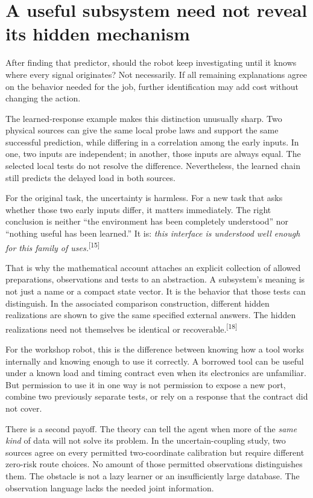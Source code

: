\documentclass[11pt]{article}
\newcommand{\sn}[1]{\textsuperscript{[#1]}}
\begin{document}
\section{A useful subsystem need not reveal its hidden mechanism}

After finding that predictor, should the robot keep investigating until it knows where every signal originates? Not necessarily. If all remaining explanations agree on the behavior needed for the job, further identification may add cost without changing the action.

The learned-response example makes this distinction unusually sharp. Two physical sources can give the same local probe laws and support the same successful prediction, while differing in a correlation among the early inputs. In one, two inputs are independent; in another, those inputs are always equal. The selected local tests do not resolve the difference. Nevertheless, the learned chain still predicts the delayed load in both sources.

For the original task, the uncertainty is harmless. For a new task that asks whether those two early inputs differ, it matters immediately. The right conclusion is neither ``the environment has been completely understood'' nor ``nothing useful has been learned.'' It is: \emph{this interface is understood well enough for this family of uses.}\sn{15}

That is why the mathematical account attaches an explicit collection of allowed preparations, observations and tests to an abstraction. A subsystem's meaning is not just a name or a compact state vector. It is the behavior that those tests can distinguish. In the associated comparison construction, different hidden realizations are shown to give the same specified external answers. The hidden realizations need not themselves be identical or recoverable.\sn{18}

For the workshop robot, this is the difference between knowing how a tool works internally and knowing enough to use it correctly. A borrowed tool can be useful under a known load and timing contract even when its electronics are unfamiliar. But permission to use it in one way is not permission to expose a new port, combine two previously separate tests, or rely on a response that the contract did not cover.

There is a second payoff. The theory can tell the agent when more of the \emph{same kind} of data will not solve its problem. In the uncertain-coupling study, two sources agree on every permitted two-coordinate calibration but require different zero-risk route choices. No amount of those permitted observations distinguishes them. The obstacle is not a lazy learner or an insufficiently large database. The observation language lacks the needed joint information.
\end{document}
